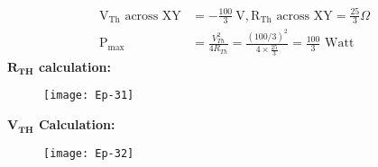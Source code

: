 \begin{enumerate}
\begin{answer}
		\begin{align*}
		\mathrm{V}_{\mathrm{Th}} \text { across } \mathrm{XY}&=-\frac{100}{3} \mathrm{~V}, \mathrm{R}_{\mathrm{Th}} \text { across } \mathrm{XY}=\frac{25}{3} \Omega \\
		\mathrm{P}_{\max }&=\frac{V_{T h}^{2}}{4 R_{T h}}=\frac{(100 / 3)^{2}}{4 \times \frac{25}{3}}=\frac{100}{3} \text { Watt }
		\end{align*}
		\textbf{$\mathbf{R}_{\mathbf{TH}}$ calculation:}
		\begin{figure}[H]
			\centering
			\texttt{[image: Ep-31]}
		\end{figure}
		\textbf{$\mathbf{V}_{\mathbf{TH}}$ Calculation:}
			\begin{figure}[H]
			\centering
			\texttt{[image: Ep-32]}
		\end{figure}
	\end{answer}
\end{enumerate}

